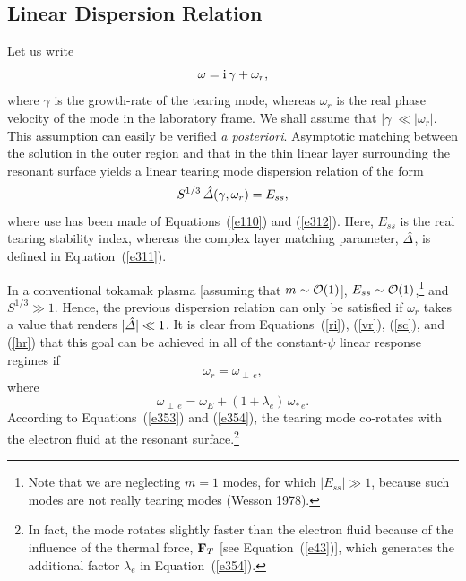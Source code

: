 \documentclass[notitlepage,12pt]{article}
\begin{document}
\subsection{Linear Dispersion Relation}\label{s6.2}
Let us write
\begin{equation}\label{e350}
\omega = {\rm i}\,\gamma+\omega_r,
\end{equation}
where $\gamma$ is the growth-rate of the tearing mode, whereas $\omega_r$ is the real
phase velocity of the mode in the laboratory frame. We shall assume that $|\gamma|\ll |\omega_r|$. This assumption can
easily be verified {\em a posteriori}. Asymptotic matching between the solution in the outer region and that in the
thin linear layer surrounding the resonant surface yields a linear tearing mode dispersion relation of the form
\begin{equation}\label{e352}
S^{1/3}\,\hat{\mit\Delta}(\gamma,\omega_r) = E_{ss},
\end{equation}
where use has been made of Equations~(\ref{e110}) and (\ref{e312}). Here, $E_{ss}$ is the real tearing stability index, 
whereas the complex layer matching parameter, $\hat{\mit\Delta}$, is defined in Equation~(\ref{e311}). 

In a conventional tokamak plasma [assuming that $m\sim {\cal O}(1)$], $E_{ss}\sim {\cal O}(1)$,\footnote{Note that we are neglecting $m=1$ modes, for which $|E_{ss}|\gg 1$,
because such modes are not really tearing modes
(Wesson 1978).} and $S^{1/3}\gg 1$. Hence, the previous dispersion relation can only be satisfied if $\omega_r$ takes a
value that renders $|\hat{\mit\Delta}|\ll 1$. It is clear from Equations~(\ref{ri}), (\ref{vr}), (\ref{sc}), and (\ref{hr}) that this goal
can be achieved in all of the constant-$\psi$ linear response regimes if
\begin{equation}\label{e353}
\omega_r = \omega_{\perp\,e},
\end{equation}
where
\begin{equation}\label{e354}
\omega_{\perp\,e} = \omega_E+(1+\lambda_e)\,\omega_{\ast\,e}.
\end{equation}
According to Equations~(\ref{e353}) and (\ref{e354}), the tearing mode co-rotates with the electron fluid at the resonant
 surface.\footnote{In fact, the mode 
rotates slightly faster than the electron fluid because of the influence of the thermal force, ${\bf F}_T$ [see Equation~(\ref{e43})],
which generates the additional  factor $\lambda_e$ in Equation~(\ref{e354}).}
\end{document}
